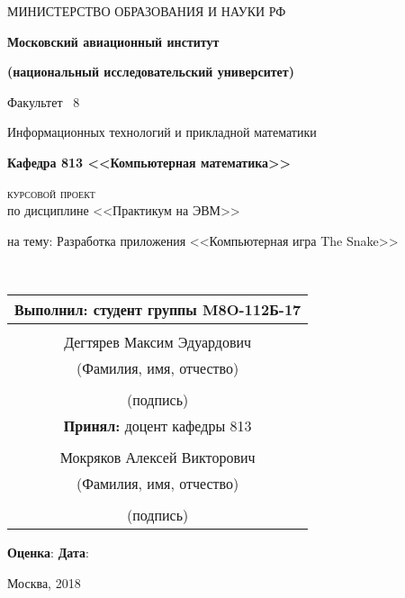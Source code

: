 \begin{center}
{\large	МИНИСТЕРСТВО ОБРАЗОВАНИЯ И НАУКИ РФ 
	
	\textbf{Московский авиационный институт }
	
	\textbf{(национальный исследовательский университет)} 
	\bigskip
	
	Факультет \textnumero~8 
	
	Информационных технологий и прикладной математики}
	
	\bigskip
	
	\textbf{Кафедра 813 <<Компьютерная математика>>}
	
	\vfill \textsc{\Large курсовой проект} \\
	{\large по дисциплине <<Практикум на ЭВМ>>}
	\bigskip

	на тему: Разработка приложения <<Компьютерная игра The Snake>>
\end{center}
\vspace*{1.5cm}

\hfill 
\begin{minipage}{.6\linewidth}\
\begin{tabular}{c}
\textbf{Выполнил:} студент группы M8O-112Б-17 \\\hline \\[.3cm]
{\large Дегтярев Максим Эдуардович} \\ \hline \scriptsize{(Фамилия, имя, отчество)}
\\[.3cm] \\ \hline
\scriptsize{(подпись)} \\[.3cm]
\textbf{Принял: }\hfill доцент кафедры 813 \\\hline 
\\[.3cm]

Мокряков Алексей Викторович \\\hline 
\scriptsize{(Фамилия, имя, отчество)}
\\[.3cm] \\ \hline
\scriptsize{(подпись)} 
\end{tabular}
\vspace*{1cm}
\end{minipage}		

\centerline{\textbf{Оценка}: \hspace*{8cm} \textbf{Дата}: \hspace*{2cm}}
\vspace*{1cm}

\centerline{Москва, 2018}

